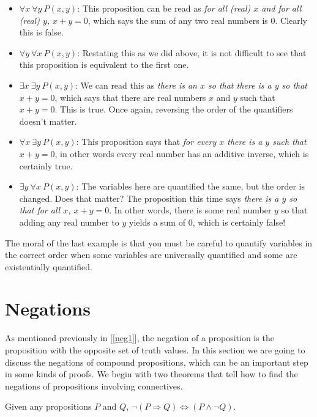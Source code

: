 \begin{itemize}\itemsep0pt
\item $\forall x\ \forall y\ P(x,y)$: This proposition can be read as \emph{for all (real) $x$ and for all (real) $y$, $x+y=0$}, which says the sum of any two real numbers is 0. Clearly this is false. 
\item $\forall y\ \forall x\ P(x,y)$: Restating this as we did above, it is not difficult to see that this proposition is equivalent to the first one.
\item $\exists x\ \exists y\ P(x,y)$: We can read this as \emph{there is an $x$ so that there is a $y$ so that $x+y=0$}, which says that there are real numbers $x$ and $y$ such that $x+y=0$. This is true. Once again, reversing the order of the quantifiers doesn't matter.
\item $\forall x\ \exists y\ P(x,y)$: This proposition says that \emph{for every $x$ there is a $y$ such that $x+y=0$}, in other words every real number has an additive inverse, which is certainly true.
\item $\exists y\ \forall x\ P(x,y)$: The variables here are quantified the same, but the order is changed. Does that matter? The proposition this time says \emph{there is a $y$ so that for all $x$, $x+y=0$}. In other words, there is some real number $y$ so that adding any real number to $y$ yields a sum of 0, which is certainly false!
\end{itemize}

The moral of the last example is that you must be careful to quantify variables in the correct order when some variables are universally quantified and some are existentially quantified.

\section{Negations}

As mentioned previously in [\ref{neg1}], the negation of a proposition is the proposition with the opposite set of truth values.  In this section we are going to discuss the negations of compound propositions, which can be an important step in some kinds of proofs. We begin with two theorems that tell how to find the negations of propositions involving connectives.

\begin{thrm}\label{thrm:negimp}
Given any propositions $P$ and $Q$, $\neg(P\Rightarrow Q)\Leftrightarrow (P\land\neg Q)$.
\end{thrm}

